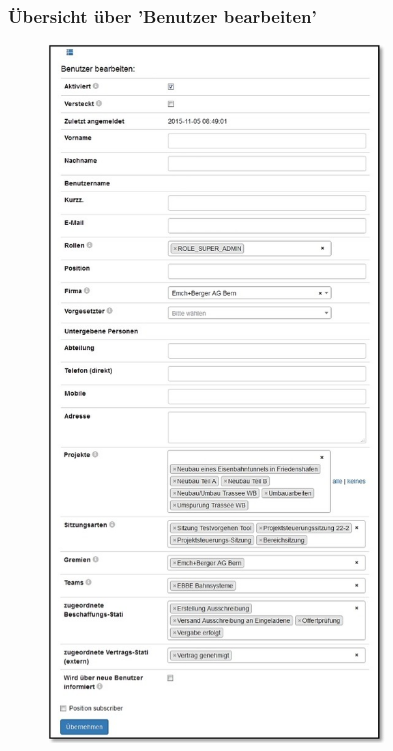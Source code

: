 \subsubsection{Übersicht über 'Benutzer bearbeiten'}

\vspace{\baselineskip}
\vspace{\baselineskip}

\begin{figure}
\vspace{-55pt}
\includegraphics[height=185mm]{../chapters/14_Benutzerverwaltung/pictures/14-1-1_BenutzerBearbeiten.jpg}
\end{figure}

